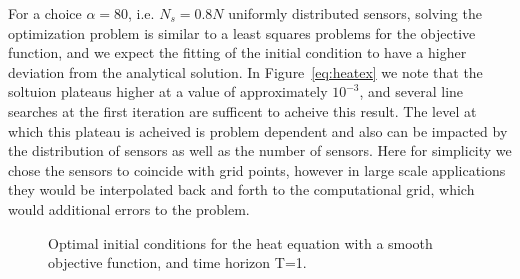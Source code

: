 \documentclass[10pt]{article}
\begin{document}
For a choice $\alpha=80$, i.e. $N_s=0.8N$ uniformly distributed sensors, solving the optimization problem is similar to a least squares problems for the objective function, and we expect the fitting of the initial condition to have a higher deviation from the analytical solution. In Figure~\ref{eq:heatex} we note that the soltuion plateaus higher at a value of approximately $10^{-3}$, and several line searches at the first iteration are sufficent to acheive this result. The level at which this plateau is acheived is problem dependent and also can be impacted by the distribution of sensors as well as the number of sensors. Here for simplicity we chose the sensors to coincide with grid points, however in large scale applications they would be interpolated back and forth to the computational grid, which would additional errors to the problem.




\begin{figure}[!ht]
\centering
{}
\quad
{}
\caption{Optimal initial conditions for the heat equation with a smooth objective function, and time horizon T=1.}
\end{figure}
\end{document}
